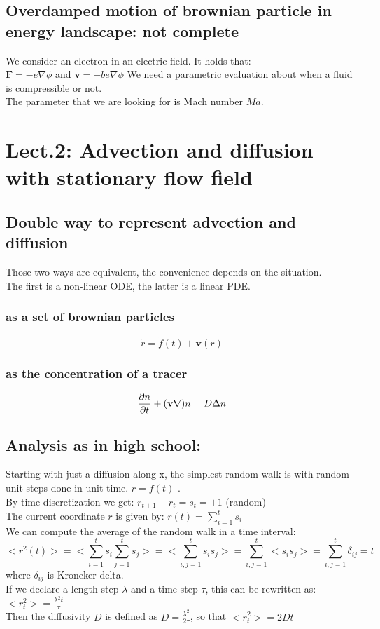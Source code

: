 \documentclass[a4paper,11pt]{article}
\begin{document}
\subsection{Overdamped motion of brownian particle in energy landscape: not complete}
We consider an electron in an electric field. It holds that: \\
$ \mathbf{F}=-e \nabla \phi $ and $ \mathbf{v}=-b e \nabla \phi$
We need a parametric evaluation about when a fluid is compressible or not. \\
The parameter that we are looking for is Mach number $Ma$.


\newpage
	\section{Lect.2: Advection and diffusion with stationary flow field}
	
\subsection{Double way to represent advection and diffusion}
Those two ways are equivalent, the convenience depends on the situation.\\
The first is a non-linear ODE, the latter is a linear PDE.
		\subsubsection{as a set of brownian particles}
\[ \dot{r}=\dot{f}(t)+\mathbf{v}(r) \]
		\subsubsection{as the concentration of a tracer}
\[  \pdv{n}{t}+(\mathbf{v}\nabla)n=D \Delta n \]

\subsection{Analysis as in high school:}
Starting with just a diffusion along x, the simplest random walk is with random unit steps done in unit time. $\dot{r}=f(t)$ . \\
By time-discretization we get: $ r_{t+1}-r_{t}=s_t=\pm 1  $ (random) \\
The current coordinate $r$ is given by:  $r(t)=\sum_{i=1}^{t}s_i$    	\\
We can compute the average of the random walk in a time interval:
\[ <r^2(t)>= <\sum_{i=1}^{t}s_i \sum_{j=1}^{t}s_j>=<\sum_{i,j=1}^{t}s_i s_j>= \sum_{i,j=1}^{t}<s_i s_j>= \sum_{i,j=1}^{t} \delta_{ij}=t   \]
where $\delta_{ij}$ is Kroneker delta.\\
If we declare a length step $\lambda$ and a time step $\tau$, this can be rewritten as: $<r_t^2>=\frac{\lambda^2 t}{\tau}$ \\
Then the diffusivity $D$ is defined as $D=\frac{\lambda^2}{2 \tau}$, so that $<r_t^2>=2Dt$\\
\end{document}
